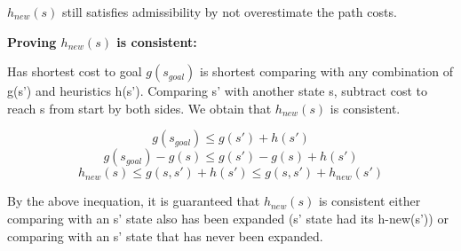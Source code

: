 \documentclass{article}
\begin{document}
\begin{enumerate}
\begin{enumerate}
            $h_{new}(s)$ still satisfies admissibility by not overestimate the path costs.

            \textbf{Proving $h_{new}(s)$ is consistent:} \par
            Has shortest cost to goal $g(s_{goal})$ is shortest comparing with any combination of g(s') and heuristics h(s'). Comparing s' with another state s, subtract cost to reach s from start by both sides. We obtain that $h_{new}(s)$ is consistent.
            
            \[g(s_{goal}) \leq g(s') + h(s') \] 
            \[g(s_{goal}) - g(s) \leq g(s') - g(s) + h(s') \] 
            \[h_{new}(s) \leq g(s,s') + h(s') \leq g(s,s') + h_{new}(s') \]         

            By the above inequation, it is guaranteed that $h_{new}(s)$ is consistent either comparing with an s' state also has been expanded (s' state had its h-new(s')) or comparing with an s' state that has never been expanded.
                

\end{enumerate}
\end{enumerate}
\end{document}
